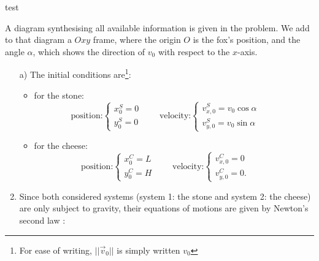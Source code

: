 %
%
test
\begin{center}
\vspace*{5mm}
\end{center}


A diagram synthesising all available information is given in the problem. We add to that diagram a $Oxy$ frame, where the origin $O$ is the fox's position, and the angle $\alpha$, which shows the direction of $v_0$ with respect to the $x$-axis.
\begin{center}

\end{center}
\begin{enumerate}
\item[a)] The initial conditions are\footnote{For ease of writing, $||\vec{v}_0||$ is simply written $v_0$}:\\
\begin{itemize}
\item for the stone: \\
\begin{displaymath}
\textrm{position:}
\left\{ \begin{array}{l}
x_0^S = 0 \\
y_0^S = 0
\end{array}\right.\qquad
\textrm{velocity:}
\left\{ \begin{array}{l}
v_{x,0}^S = v_0\cos\alpha\\
v_{y,0}^S = v_0\sin\alpha
\end{array}\right.\qquad
\end{displaymath}
\item for the cheese: \\
\begin{displaymath}
\textrm{position:}
\left\{ \begin{array}{l}
x_0^C = L \\
y_0^C = H
\end{array}\right.\qquad
\textrm{velocity:}
\left\{ \begin{array}{l}
v_{x,0}^C = 0\\
v_{y,0}^C = 0.
\end{array}\right.\qquad
\end{displaymath}
\end{itemize}
\item Since both considered systems (system 1: the stone and system 2: the cheese) are only subject to gravity, their equations of motions are given by Newton's second law : 

\end{enumerate}
